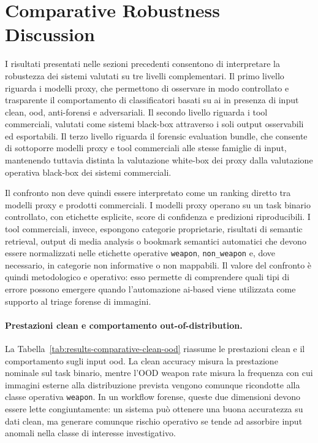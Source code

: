 \section{Comparative Robustness Discussion}
\label{sec:results-comparative}

I risultati presentati nelle sezioni precedenti consentono di interpretare la
robustezza dei sistemi valutati su tre livelli complementari. Il primo livello
riguarda i modelli proxy, che permettono di osservare in modo controllato e
trasparente il comportamento di classificatori basati su \gls{ai} in presenza di
input clean, \gls{ood}, anti-forensi e adversariali. Il secondo livello riguarda
i tool commerciali, valutati come sistemi black-box attraverso i soli output
osservabili ed esportabili. Il terzo livello riguarda il forensic evaluation
bundle, che consente di sottoporre modelli proxy e tool commerciali alle stesse
famiglie di input, mantenendo tuttavia distinta la valutazione white-box dei
proxy dalla valutazione operativa black-box dei sistemi commerciali.

Il confronto non deve quindi essere interpretato come un ranking diretto tra
modelli proxy e prodotti commerciali. I modelli proxy operano su un task binario
controllato, con etichette esplicite, score di confidenza e predizioni
riproducibili. I tool commerciali, invece, espongono categorie proprietarie, risultati di semantic retrieval,
output di media analysis o bookmark semantici automatici che devono essere
normalizzati nelle etichette operative \texttt{weapon}, \texttt{non\_weapon} e,
dove necessario, in categorie non informative o non mappabili. Il valore del
confronto è quindi metodologico e operativo: esso permette di comprendere quali
tipi di errore possono emergere quando l'automazione \gls{ai}-based viene
utilizzata come supporto al triage forense di immagini.

\paragraph{Prestazioni clean e comportamento out-of-distribution.}

La Tabella~\ref{tab:results-comparative-clean-ood} riassume le prestazioni clean
e il comportamento sugli input \gls{ood}. La clean accuracy misura la prestazione
nominale sul task binario, mentre l'OOD weapon rate misura la frequenza con cui
immagini esterne alla distribuzione prevista vengono comunque ricondotte alla
classe operativa \texttt{weapon}. In un workflow forense, queste due dimensioni
devono essere lette congiuntamente: un sistema può ottenere una buona accuratezza
su dati clean, ma generare comunque rischio operativo se tende ad assorbire input
anomali nella classe di interesse investigativo.

